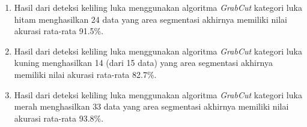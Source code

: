 \begin{enumerate}
	\item Hasil dari deteksi keliling luka menggunakan algoritma \emph{GrabCut} 
	kategori luka hitam menghasilkan 24 data yang area segmentasi akhirnya memiliki 
	nilai akurasi rata-rata 91.5\%.

	\item Hasil dari deteksi keliling luka menggunakan algoritma \emph{GrabCut} 
	kategori luka kuning menghasilkan 14 (dari 15 data) yang area segmentasi akhirnya 
	memiliki nilai akurasi rata-rata 82.7\%.

	\item Hasil dari deteksi keliling luka menggunakan algoritma \emph{GrabCut} 
	kategori luka merah menghasilkan 33 data yang area segmentasi akhirnya memiliki 
	nilai akurasi rata-rata 93.8\%.






\end{enumerate}
